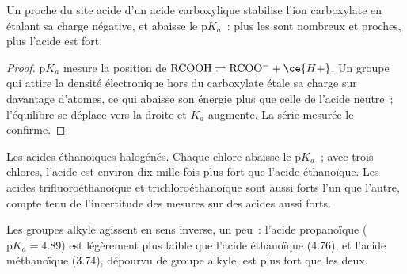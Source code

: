 \begin{proposition}\label{prop:b1:electronic-effects:inductive-pka}
Un  proche du site acide d'un acide carboxylique
stabilise l'ion carboxylate en étalant sa charge négative, et abaisse le
$\mathrm{p}K_a$~: plus les  sont nombreux et proches,
plus l'acide est fort.
\end{proposition}

\begin{proof}
$\mathrm{p}K_a$ mesure la position de $\mathrm{RCOOH} \rightleftharpoons
\mathrm{RCOO^-} + \ce{H+}$. Un groupe qui attire la densité électronique
hors du carboxylate étale sa charge sur davantage d'atomes, ce qui
abaisse son énergie plus que celle de l'acide neutre~; l'équilibre se
déplace vers la droite et $K_a$ augmente. La série mesurée le confirme.
\end{proof}

\begin{omfigure}

{\small Les acides éthanoïques halogénés. Chaque chlore abaisse le
$\mathrm{p}K_a$~; avec trois chlores, l'acide est environ dix mille fois
plus fort que l'acide éthanoïque. Les acides trifluoroéthanoïque et
trichloroéthanoïque sont aussi forts l'un que l'autre, compte tenu de
l'incertitude des mesures sur des acides aussi forts.}
\end{omfigure}

Les groupes alkyle agissent en sens inverse, un peu~: l'acide
propanoïque ($\mathrm{p}K_a
= 4.89$) est légèrement plus faible que l'acide éthanoïque (4.76), et
l'acide méthanoïque (3.74), dépourvu de groupe alkyle, est plus fort que
les deux.

